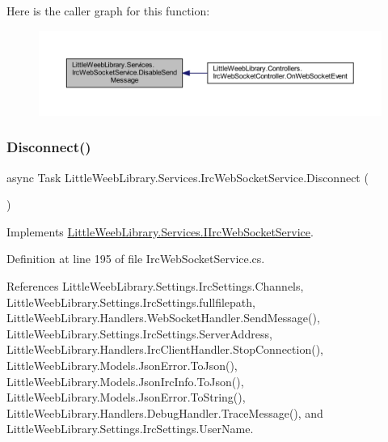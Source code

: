 Here is the caller graph for this function\+:\nopagebreak
\begin{figure}[H]
\begin{center}
\leavevmode
\includegraphics[width=350pt]{class_little_weeb_library_1_1_services_1_1_irc_web_socket_service_a71f89c2a8e9b0a86972d192bc3e55318_icgraph}
\end{center}
\end{figure}
\mbox{\label{class_little_weeb_library_1_1_services_1_1_irc_web_socket_service_a637703e827e16a5d99055119bfe62972}} 
\subsubsection{\texorpdfstring{Disconnect()}{Disconnect()}}
{\footnotesize\ttfamily async Task Little\+Weeb\+Library.\+Services.\+Irc\+Web\+Socket\+Service.\+Disconnect (\begin{DoxyParamCaption}{ }\end{DoxyParamCaption})}



Implements \mbox{\hyperlink{interface_little_weeb_library_1_1_services_1_1_i_irc_web_socket_service_ac3bedeb941873ec5211357841a1e6e92}{Little\+Weeb\+Library.\+Services.\+I\+Irc\+Web\+Socket\+Service}}.



Definition at line 195 of file Irc\+Web\+Socket\+Service.\+cs.



References Little\+Weeb\+Library.\+Settings.\+Irc\+Settings.\+Channels, Little\+Weeb\+Library.\+Settings.\+Irc\+Settings.\+fullfilepath, Little\+Weeb\+Library.\+Handlers.\+Web\+Socket\+Handler.\+Send\+Message(), Little\+Weeb\+Library.\+Settings.\+Irc\+Settings.\+Server\+Address, Little\+Weeb\+Library.\+Handlers.\+Irc\+Client\+Handler.\+Stop\+Connection(), Little\+Weeb\+Library.\+Models.\+Json\+Error.\+To\+Json(), Little\+Weeb\+Library.\+Models.\+Json\+Irc\+Info.\+To\+Json(), Little\+Weeb\+Library.\+Models.\+Json\+Error.\+To\+String(), Little\+Weeb\+Library.\+Handlers.\+Debug\+Handler.\+Trace\+Message(), and Little\+Weeb\+Library.\+Settings.\+Irc\+Settings.\+User\+Name.



